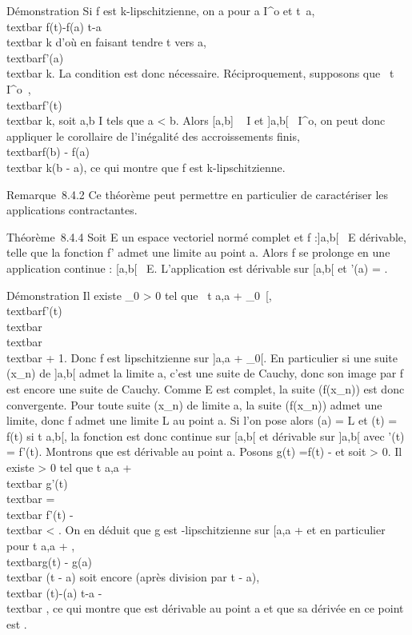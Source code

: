 \documentclass[]{article}
\begin{document}
Démonstration Si f est k-lipschitzienne, on a pour a \in I^o et
t\neq~a, \\textbar{} f(t)-f(a)
\over t-a \\textbar{} \leq k d'où en
faisant tendre t vers a,
\\textbar{}f'(a)\\textbar{} \leq k. La
condition est donc nécessaire. Réciproquement, supposons que
\forall~t \in I^o~,
\\textbar{}f'(t)\\textbar{} \leq k, soit a,b
\in I tels que a \textless{} b. Alors {[}a,b{]} \subset~ I et {]}a,b{[}\subset~
I^o, on peut donc appliquer le corollaire de l'inégalité des
accroissements finis, \\textbar{}f(b) -
f(a)\\textbar{} \leq k(b - a), ce qui montre que f est
k-lipschitzienne.

Remarque~8.4.2 Ce théorème peut permettre en particulier de caractériser
les applications contractantes.

Théorème~8.4.4 Soit E un espace vectoriel normé complet et f :{]}a,b{[}\rightarrow~
E dérivable, telle que la fonction f' admet une limite \ell au point a.
Alors f se prolonge en une application continue
\tildef : {[}a,b{[}\rightarrow~ E. L'application
\tildef est dérivable sur {[}a,b{[} et
\tildef'(a) = \ell.

Démonstration Il existe \eta\_0 \textgreater{} 0 tel que
\forall~t \in{]}a,a + \eta\_0~{[},
\\textbar{}f'(t)\\textbar{}
\leq\\textbar{} \ell\\textbar{} + 1. Donc f est
lipschitzienne sur {]}a,a + \eta\_0{[}. En particulier si une suite
(x\_n) de {]}a,b{[} admet la limite a, c'est une suite de
Cauchy, donc son image par f est encore une suite de Cauchy. Comme E est
complet, la suite (f(x\_n)) est donc convergente. Pour toute
suite (x\_n) de limite a, la suite (f(x\_n)) admet une
limite, donc f admet une limite L au point a. Si l'on pose alors
\tildef(a) = L et \tildef(t) =
f(t) si t \in{]}a,b{[}, la fonction \tildef est donc
continue sur {[}a,b{[} et dérivable sur {]}a,b{[} avec
\tildef'(t) = f'(t). Montrons que
\tildef est dérivable au point a. Posons g(t)
=\tilde f(t) - \ellt et soit \epsilon \textgreater{} 0. Il
existe \eta \textgreater{} 0 tel que t \in{]}a,a +
\eta{[}\rigtharrow~\\textbar{} g'(t)\\textbar{}
=\\textbar{} f'(t) - \ell\\textbar{}
\textless{} \epsilon. On en déduit que g est \epsilon-lipschitzienne sur {[}a,a + \eta{]}
et en particulier pour t \in {[}a,a + \eta{]}, \\textbar{}g(t)
- g(a)\\textbar{} \leq \epsilon(t - a) soit encore (après division
par t - a), \\textbar{}
\tildef(t)-\tildef(a)
\over t-a - \ell\\textbar{} \leq \epsilon, ce qui
montre que \tildef est dérivable au point a et que sa
dérivée en ce point est \ell.
\end{document}
